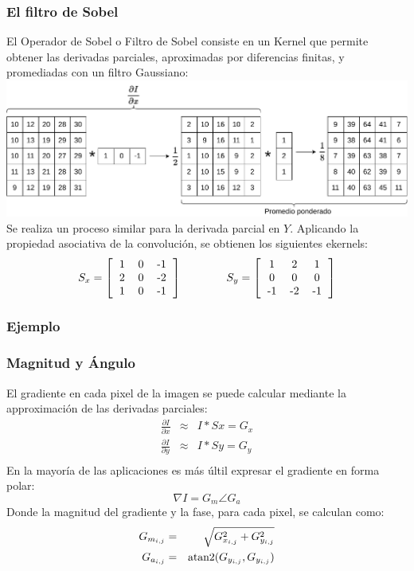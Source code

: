 \begin{frame}\frametitle{El filtro de Sobel}
  El Operador de Sobel o Filtro de Sobel consiste en un Kernel que permite obtener las derivadas parciales, aproximadas por diferencias finitas, y promediadas con un filtro Gaussiano:
  \includegraphics[width=\textwidth]{Figures/SobelX1.pdf}
  Se realiza un proceso similar para la derivada parcial en $Y$. Aplicando la propiedad asociativa de la convolución, se obtienen los siguientes ekernels:
  \[S_x = \left[\begin{tabular}{ccc}1 & 0 & -1\\2 & 0 & -2\\1 & 0 & -1 \end{tabular}\right]\qquad\qquad
  S_y = \left[\begin{tabular}{ccc}1 & 2 & 1\\0 & 0 & 0\\-1 & -2 & -1 \end{tabular}\right]\]
\end{frame}

\begin{frame}\frametitle{Ejemplo}
\end{frame}

\begin{frame}\frametitle{Magnitud y Ángulo}
  El gradiente en cada pixel de la imagen se puede calcular mediante la approximación de las derivadas parciales:
  \begin{eqnarray*}
    \frac{\partial I}{\partial x} &\approx& I * Sx = G_x\\
    \frac{\partial I}{\partial y} &\approx& I * Sy = G_y\\
  \end{eqnarray*}
  En la mayoría de las aplicaciones es más últil expresar el gradiente en forma polar:
  \[ \nabla I = G_m \angle G_a \]
  Donde la magnitud del gradiente y la fase, para cada pixel, se calculan como:
  \begin{eqnarray*}
    G_{m_{i,j}} &=& \sqrt{G_{x_{i,j}}^2 + G_{y_{i,j}}^2}\\
    G_{a_{i,j}} &=& \operatorname{atan2}(G_{y_{i,j}}, G_{y_{i,j}})\\
  \end{eqnarray*}
\end{frame}

